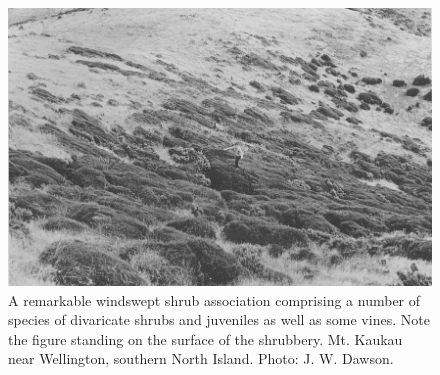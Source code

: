\begin{figure}[htb]
	\centering
	\begin{minipage}[t]{0.689\textwidth}
		\centering
		\includegraphics[width=\textwidth]{graphics/figure74shrubs.jpg}
    	\caption[A remarkable windswept shrub association]{A remarkable windswept shrub association comprising a number of species of divaricate shrubs and juveniles as well as some vines.
    	Note the figure standing on the surface of the shrubbery.
    	Mt. Kaukau near Wellington, southern North Island.
    	Photo: J. W. Dawson.}%
    	\label{fig:74shrubs}
	\end{minipage}\hfill%
	\begin{minipage}[t]{0.291\textwidth}
    	\centering

\end{minipage}
\end{figure}
